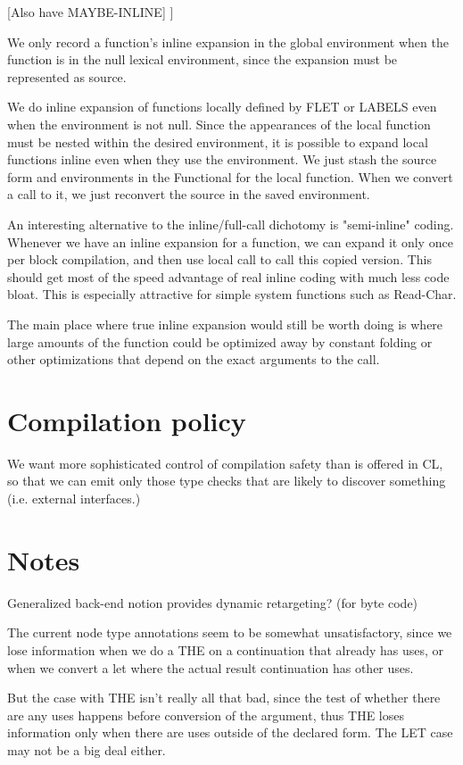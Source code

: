 [Also have MAYBE-INLINE]
]

We only record a function's inline expansion in the global environment when the
function is in the null lexical environment, since the expansion must be
represented as source.

We do inline expansion of functions locally defined by FLET or LABELS even when
the environment is not null.  Since the appearances of the local function must
be nested within the desired environment, it is possible to expand local
functions inline even when they use the environment.  We just stash the source
form and environments in the Functional for the local function.  When we
convert a call to it, we just reconvert the source in the saved environment.

An interesting alternative to the inline/full-call dichotomy is "semi-inline"
coding.  Whenever we have an inline expansion for a function, we can expand it
only once per block compilation, and then use local call to call this copied
version.  This should get most of the speed advantage of real inline coding
with much less code bloat.  This is especially attractive for simple system
functions such as Read-Char.

The main place where true inline expansion would still be worth doing is where
large amounts of the function could be optimized away by constant folding or
other optimizations that depend on the exact arguments to the call.



\section{Compilation policy}

We want more sophisticated control of compilation safety than is offered in CL,
so that we can emit only those type checks that are likely to discover
something (i.e. external interfaces.)



\section{Notes}

Generalized back-end notion provides dynamic retargeting?  (for byte code)

The current node type annotations seem to be somewhat unsatisfactory, since we
lose information when we do a THE on a continuation that already has uses, or
when we convert a let where the actual result continuation has other uses.  

But the case with THE isn't really all that bad, since the test of whether
there are any uses happens before conversion of the argument, thus THE loses
information only when there are uses outside of the declared form.  The LET
case may not be a big deal either.

